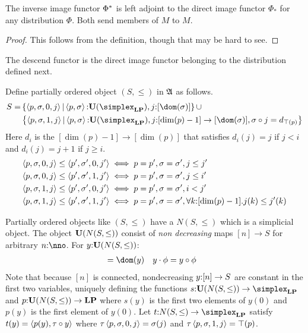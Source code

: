 \documentclass[csh.tex]{subfiles}
\begin{document}
\begin{lemma}
The inverse image functor $\Phi^*$ is left adjoint to the direct image functor $\Phi_*$ for any distribution $\Phi$. Both send members of $M$ to $M$.
\end{lemma}

\begin{proof} This follows from the definition, though that may be hard to see.
\end{proof}

The descend functor is the direct image functor belonging to the distribution defined next.

\begin{definition}
Define partially ordered object $(S,\leq)$ in $\mathfrak A$ as follows.
\begin{align*} 
S =& \set{\tuplet{p,\sigma,0,j}|\tuplet{p,\sigma}\of\base(\simplex_\LP),j\of[\dom(\sigma)]}\cup\\&
\set{\tuplet{p,\sigma,1,j}|\tuplet{p,\sigma}\of\base(\simplex_\LP),
j\of[\dim(p)-1]\to [\dom(\sigma)],\sigma\circ j = d_{\top(p)}}\\
\end{align*}
Here $d_i$ is the  $[\dim(p)-1]\to[\dim(p)]$ that satisfies $d_i(j) = j$ if $j<i$ and $d_i(j) = j+1$ if $j\geq i$.
\begin{align*}
\left\langle p,\sigma,0,j \right\rangle\leq\left\langle p',\sigma',0,j' \right\rangle &
\iff p=p',\sigma=\sigma',j\leq j'\\
\left\langle p,\sigma,0,j \right\rangle\leq\left\langle p',\sigma',1,j' \right\rangle &
\iff p=p',\sigma=\sigma',j \leq i'\\ 
\left\langle p,\sigma,1,j \right\rangle\leq\left\langle p',\sigma',0,j' \right\rangle &
\iff p=p',\sigma=\sigma',i < j'\\ 
\left\langle p,\sigma,1,j \right\rangle\leq\left\langle p',\sigma',1,j' \right\rangle &
\iff p=p',\sigma=\sigma',\forall k\mathord :[\dim(p)-1].j(k)\leq j'(k)
\end{align*}

Partially ordered objects like $(S,\leq)$ have a  $N(S,\leq)$ which is a simplicial object. The object $\mathbf{U}(N(S,\leq))$ consist of \emph{non decreasing} maps $[n]\to S$ for arbitrary $n\of\nno$. For $y\mathord : \mathbf{U}(N(S,\leq))$:
\begin{align*}
[\dim(y)] &= \dom(y)&
y\cdot \phi &= y\circ \phi
\end{align*}
Note that because $[n]$ is connected, nondecreasing $y\mathord :[n]\to S$ are constant in the first two variables, uniquely defining the functions $s\of \base(N(S,\leq))\to \simplex_\LP$ and $p\mathord : \mathbf{U}(N(S,\leq))\to \mathbf{LP}$
where $s(y)$ is the first two elements of $y(0)$ and $p(y)$ is the first element of $y(0)$. Let $t\of N(S,\leq)\to \simplex_\LP$ satisfy 
$t(y) = \left\langle p(y),\tau\circ y \right\rangle$ where $\tau\left\langle p,\sigma,0,j \right\rangle = \sigma(j)$ and $\tau\left\langle p,\sigma,1,j \right\rangle = \top(p)$.

\end{definition}
\end{document}
